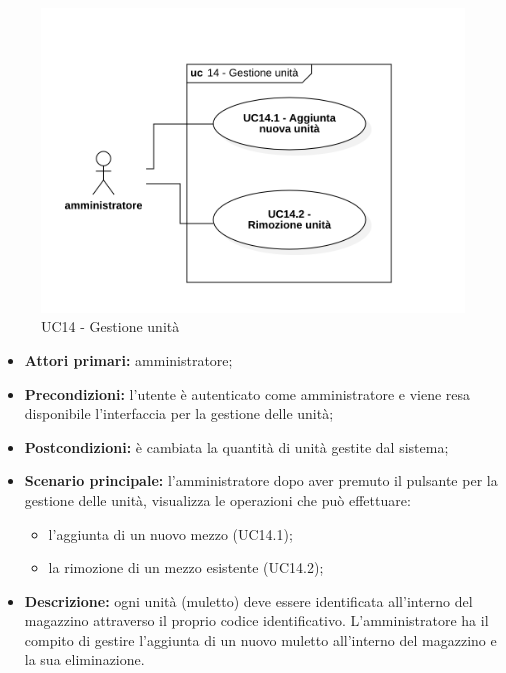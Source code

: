 \begin{figure}[H]
	\centering
	\includegraphics[scale=0.52]{res/images/uc14.png}
	\caption{UC14 - Gestione unità}
\end{figure}

\begin{itemize}
	\item 	\textbf{Attori primari:} amministratore;
	\item 	\textbf{Precondizioni:} l'utente è autenticato come amministratore e viene resa disponibile l'interfaccia per la gestione delle unità;
	\item 	\textbf{Postcondizioni:} è cambiata la quantità di unità gestite dal sistema;
	\item 	\textbf{Scenario principale:} l'amministratore dopo aver premuto il pulsante per la gestione delle unità, visualizza le operazioni che può effettuare:
	\begin{itemize}
		\item l'aggiunta di un nuovo mezzo (UC14.1);
		\item la rimozione di un mezzo esistente (UC14.2);
	\end{itemize}
	\item 	\textbf{Descrizione:} ogni unità (muletto) deve essere identificata all'interno del magazzino attraverso il proprio codice identificativo. L'amministratore ha il compito di gestire l'aggiunta di un nuovo muletto all'interno del magazzino e la sua eliminazione.
\end{itemize}


